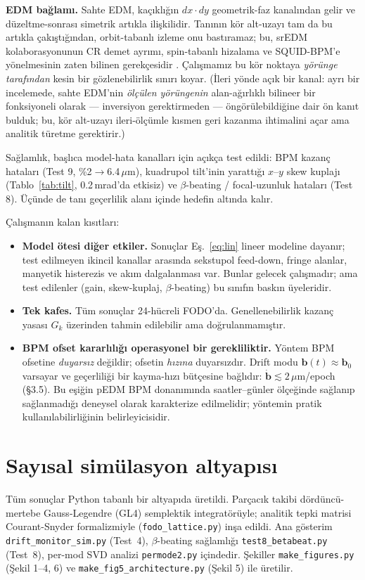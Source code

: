 \documentclass[twocolumn,a4paper,10pt]{article}
\begin{document}
\textbf{EDM bağlamı.} Sahte EDM, kaçıklığın $dx\cdot dy$ geometrik-faz kanalından
gelir \cite{haciomeroglu2017, omarov2022} ve düzeltme-sonrası simetrik artıkla
ilişkilidir. Tanının kör alt-uzayı tam da bu artıkla çakıştığından, orbit-tabanlı
izleme onu bastıramaz; bu, srEDM kolaborasyonunun CR demet ayrımı, spin-tabanlı
hizalama ve SQUID-BPM'e yönelmesinin zaten bilinen gerekçesidir
\cite{omarov2022, anastassopoulos2016}. Çalışmamız bu kör noktaya \emph{yörünge
tarafından} kesin bir gözlenebilirlik sınırı koyar. (İleri yönde açık bir kanal:
ayrı bir incelemede, sahte EDM'nin \emph{ölçülen yörüngenin} alan-ağırlıklı
bilineer bir fonksiyoneli olarak --- inversiyon gerektirmeden --- öngörülebildiğine
dair ön kanıt bulduk; bu, kör alt-uzayı ileri-ölçümle kısmen geri kazanma
ihtimalini açar ama analitik türetme gerektirir.)

Sağlamlık, başlıca model-hata kanalları için açıkça test edildi: BPM kazanç
hataları (Test 9, \%2$\to$6.4\,$\mu$m), kuadrupol tilt'inin yarattığı $x$--$y$
skew kuplajı (Tablo~\ref{tab:tilt}, 0.2\,mrad'da etkisiz) ve $\beta$-beating /
focal-uzunluk hataları (Test 8). Üçünde de tanı geçerlilik alanı içinde hedefin
altında kalır.

Çalışmanın kalan kısıtları:
\begin{itemize}
\item \textbf{Model ötesi diğer etkiler.} Sonuçlar Eş.~\eqref{eq:lin} lineer
  modeline dayanır; test edilmeyen ikincil kanallar arasında sekstupol
  feed-down, fringe alanlar, manyetik histerezis ve akım dalgalanması var.
  Bunlar gelecek çalışmadır; ama test edilenler (gain, skew-kuplaj,
  $\beta$-beating) bu sınıfın baskın üyeleridir.
\item \textbf{Tek kafes.} Tüm sonuçlar 24-hücreli FODO'da. Genellenebilirlik
  kazanç yasası $G_k$ üzerinden tahmin edilebilir ama doğrulanmamıştır.
\item \textbf{BPM ofset kararlılığı operasyonel bir gerekliliktir.} Yöntem BPM
  ofsetine \emph{duyarsız} değildir; ofsetin \emph{hızına} duyarsızdır. Drift
  modu $\mathbf{b}(t)\approx\mathbf{b}_0$ varsayar ve geçerliliği bir
  kayma-hızı bütçesine bağlıdır: $\dot{\mathbf{b}}\lesssim 2\,\mu$m/epoch
  (\S3.5). Bu eşiğin pEDM BPM donanımında saatler--günler ölçeğinde sağlanıp
  sağlanmadığı deneysel olarak karakterize edilmelidir; yöntemin pratik
  kullanılabilirliğinin belirleyicisidir.
\end{itemize}

\appendix
\section{Sayısal simülasyon altyapısı}
Tüm sonuçlar Python tabanlı bir altyapıda üretildi. Parçacık takibi
dördüncü-mertebe Gauss-Legendre (GL4) semplektik integratörüyle; analitik tepki
matrisi Courant-Snyder formalizmiyle (\texttt{fodo\_lattice.py}) inşa edildi.
Ana gösterim \texttt{drift\_monitor\_sim.py} (Test~4), $\beta$-beating
sağlamlığı \texttt{test8\_betabeat.py} (Test~8), per-mod SVD analizi
\texttt{permode2.py} içindedir. Şekiller \texttt{make\_figures.py} (Şekil 1--4,
6) ve \texttt{make\_fig5\_architecture.py} (Şekil 5) ile üretilir.
\end{document}

